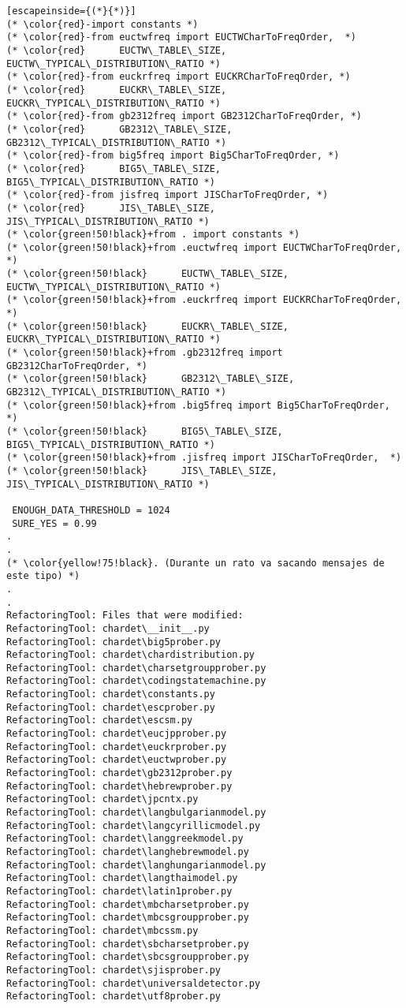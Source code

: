 \begin{lstlisting}[escapeinside={(*}{*)}]
(* \color{red}-import constants *)
(* \color{red}-from euctwfreq import EUCTWCharToFreqOrder,  *)
(* \color{red}      EUCTW\_TABLE\_SIZE, EUCTW\_TYPICAL\_DISTRIBUTION\_RATIO *)
(* \color{red}-from euckrfreq import EUCKRCharToFreqOrder, *)
(* \color{red}      EUCKR\_TABLE\_SIZE, EUCKR\_TYPICAL\_DISTRIBUTION\_RATIO *)
(* \color{red}-from gb2312freq import GB2312CharToFreqOrder, *)
(* \color{red}      GB2312\_TABLE\_SIZE, GB2312\_TYPICAL\_DISTRIBUTION\_RATIO *)
(* \color{red}-from big5freq import Big5CharToFreqOrder, *)
(* \color{red}      BIG5\_TABLE\_SIZE, BIG5\_TYPICAL\_DISTRIBUTION\_RATIO *)
(* \color{red}-from jisfreq import JISCharToFreqOrder, *)
(* \color{red}      JIS\_TABLE\_SIZE, JIS\_TYPICAL\_DISTRIBUTION\_RATIO *)
(* \color{green!50!black}+from . import constants *)
(* \color{green!50!black}+from .euctwfreq import EUCTWCharToFreqOrder, *)
(* \color{green!50!black}      EUCTW\_TABLE\_SIZE, EUCTW\_TYPICAL\_DISTRIBUTION\_RATIO *)
(* \color{green!50!black}+from .euckrfreq import EUCKRCharToFreqOrder, *)
(* \color{green!50!black}      EUCKR\_TABLE\_SIZE, EUCKR\_TYPICAL\_DISTRIBUTION\_RATIO *)
(* \color{green!50!black}+from .gb2312freq import GB2312CharToFreqOrder, *)
(* \color{green!50!black}      GB2312\_TABLE\_SIZE, GB2312\_TYPICAL\_DISTRIBUTION\_RATIO *)
(* \color{green!50!black}+from .big5freq import Big5CharToFreqOrder,  *)
(* \color{green!50!black}      BIG5\_TABLE\_SIZE, BIG5\_TYPICAL\_DISTRIBUTION\_RATIO *)
(* \color{green!50!black}+from .jisfreq import JISCharToFreqOrder,  *)
(* \color{green!50!black}      JIS\_TABLE\_SIZE, JIS\_TYPICAL\_DISTRIBUTION\_RATIO *)

 ENOUGH_DATA_THRESHOLD = 1024
 SURE_YES = 0.99
.
.
(* \color{yellow!75!black}. (Durante un rato va sacando mensajes de este tipo) *)
.
.
RefactoringTool: Files that were modified:
RefactoringTool: chardet\__init__.py
RefactoringTool: chardet\big5prober.py
RefactoringTool: chardet\chardistribution.py
RefactoringTool: chardet\charsetgroupprober.py
RefactoringTool: chardet\codingstatemachine.py
RefactoringTool: chardet\constants.py
RefactoringTool: chardet\escprober.py
RefactoringTool: chardet\escsm.py
RefactoringTool: chardet\eucjpprober.py
RefactoringTool: chardet\euckrprober.py
RefactoringTool: chardet\euctwprober.py
RefactoringTool: chardet\gb2312prober.py
RefactoringTool: chardet\hebrewprober.py
RefactoringTool: chardet\jpcntx.py
RefactoringTool: chardet\langbulgarianmodel.py
RefactoringTool: chardet\langcyrillicmodel.py
RefactoringTool: chardet\langgreekmodel.py
RefactoringTool: chardet\langhebrewmodel.py
RefactoringTool: chardet\langhungarianmodel.py
RefactoringTool: chardet\langthaimodel.py
RefactoringTool: chardet\latin1prober.py
RefactoringTool: chardet\mbcharsetprober.py
RefactoringTool: chardet\mbcsgroupprober.py
RefactoringTool: chardet\mbcssm.py
RefactoringTool: chardet\sbcharsetprober.py
RefactoringTool: chardet\sbcsgroupprober.py
RefactoringTool: chardet\sjisprober.py
RefactoringTool: chardet\universaldetector.py
RefactoringTool: chardet\utf8prober.py


\end{lstlisting}

